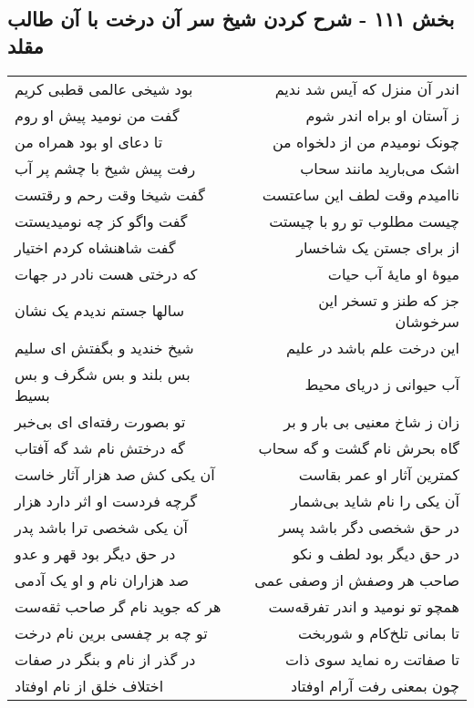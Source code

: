 \begin{center}
\section*{بخش ۱۱۱ - شرح کردن شیخ سر آن درخت با آن طالب مقلد}
\label{sec:sh111}
\begin{longtable}{l p{0.5cm} r}
بود شیخی عالمی قطبی کریم
&&
اندر آن منزل که آیس شد ندیم
\\
گفت من نومید پیش او روم
&&
ز آستان او براه اندر شوم
\\
تا دعای او بود همراه من
&&
چونک نومیدم من از دلخواه من
\\
رفت پیش شیخ با چشم پر آب
&&
اشک می‌بارید مانند سحاب
\\
گفت شیخا وقت رحم و رقتست
&&
ناامیدم وقت لطف این ساعتست
\\
گفت واگو کز چه نومیدیستت
&&
چیست مطلوب تو رو با چیستت
\\
گفت شاهنشاه کردم اختیار
&&
از برای جستن یک شاخسار
\\
که درختی هست نادر در جهات
&&
میوهٔ او مایهٔ آب حیات
\\
سالها جستم ندیدم یک نشان
&&
جز که طنز و تسخر این سرخوشان
\\
شیخ خندید و بگفتش ای سلیم
&&
این درخت علم باشد در علیم
\\
بس بلند و بس شگرف و بس بسیط
&&
آب حیوانی ز دریای محیط
\\
تو بصورت رفته‌ای ای بی‌خبر
&&
زان ز شاخ معنیی بی بار و بر
\\
گه درختش نام شد گه آفتاب
&&
گاه بحرش نام گشت و گه سحاب
\\
آن یکی کش صد هزار آثار خاست
&&
کمترین آثار او عمر بقاست
\\
گرچه فردست او اثر دارد هزار
&&
آن یکی را نام شاید بی‌شمار
\\
آن یکی شخصی ترا باشد پدر
&&
در حق شخصی دگر باشد پسر
\\
در حق دیگر بود قهر و عدو
&&
در حق دیگر بود لطف و نکو
\\
صد هزاران نام و او یک آدمی
&&
صاحب هر وصفش از وصفی عمی
\\
هر که جوید نام گر صاحب ثقه‌ست
&&
همچو تو نومید و اندر تفرقه‌ست
\\
تو چه بر چفسی برین نام درخت
&&
تا بمانی تلخ‌کام و شوربخت
\\
در گذر از نام و بنگر در صفات
&&
تا صفاتت ره نماید سوی ذات
\\
اختلاف خلق از نام اوفتاد
&&
چون بمعنی رفت آرام اوفتاد
\\
\end{longtable}
\end{center}
